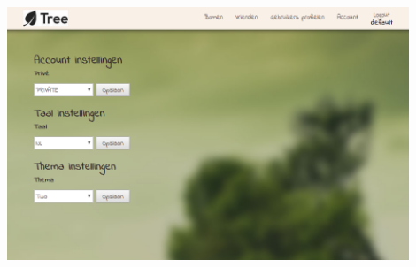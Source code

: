 \documentclass[pdftex,a4paper,12pt,twoside]{report}
\begin{document}
\includegraphics[width=12cm]{images/web_theme.png}\\[.5cm]



\appendix
\end{document}
